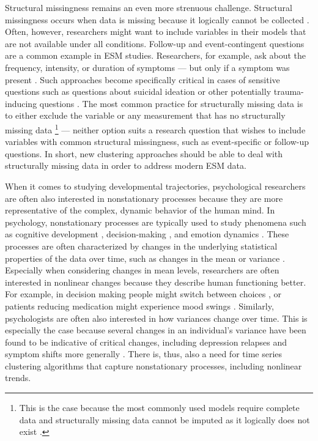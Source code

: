 \documentclass[man, 12pt, a4paper, mask, floatsintext]{apa7}
\theoremstyle{break}
\theoremstyle{plain}
\begin{document}
Structural missingness remains an even more strenuous challenge. Structural missingness occurs when data is missing because it logically cannot be collected \citep[as opposed to probabilistically missing data;][]{little2020, mclean2017}. Often, however, researchers might want to include variables in their models that are not available under all conditions. Follow-up and event-contingent questions are a common example in ESM studies. Researchers, for example, ask about the frequency, intensity, or duration of symptoms --- but only if a symptom was present \citep{kivela2022}. Such approaches become specifically critical in cases of sensitive questions such as questions about suicidal ideation or other potentially trauma-inducing questions \citep[e.g.,][]{glenn2022}. The most common practice for structurally missing data is to either exclude the variable or any measurement that has no structurally missing data \citep[e.g.,][]{lavori2008}\footnote{This is the case because the most commonly used models require complete data \citep{schafer2002} and structurally missing data cannot be imputed as it logically does not exist \citep[e.g.,][]{lavori2008}.} --- neither option suits a research question that wishes to include variables with common structural missingness, such as event-specific or follow-up questions. In short, new clustering approaches should be able to deal with structurally missing data in order to address modern ESM data.

When it comes to studying developmental trajectories, psychological researchers are often also interested in nonstationary processes because they are more representative of the complex, dynamic behavior of the human mind. In psychology, nonstationary processes are typically used to study phenomena such as cognitive development \citep[][]{quartz1997}, decision-making \citep[][]{ratcliff2016}, and emotion dynamics \citep[][]{bringmann2018b}. These processes are often characterized by changes in the underlying statistical properties of the data over time, such as changes in the mean or variance \citep[][]{molenaar2009}. Especially when considering changes in mean levels, researchers are often interested in nonlinear changes because they describe human functioning better. For example, in decision making people might switch between choices \citep[][]{ratcliff2016}, or patients reducing medication might experience mood swings \citep[][]{helmich2020a}. Similarly, psychologists are often also interested in how variances change over time. This is especially the case because several changes in an individual's variance have been found to be indicative of critical changes, including depression relapses and symptom shifts more generally \citep[e.g.,][]{schreuder2020, wichers2020}. There is, thus, also a need for time series clustering algorithms that capture nonstationary processes, including nonlinear trends.
\end{document}
